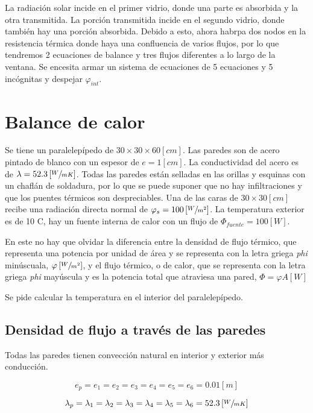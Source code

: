 \documentclass[12pt]{article}
\begin{document}
La radiación solar incide en el primer vidrio, donde una parte es absorbida y la otra transmitida. La porción transmitida incide en el segundo vidrio, donde también hay una porción absorbida. Debido a esto, ahora habrpa dos nodos en la resistencia térmica donde haya una confluencia de varios flujos, por lo que tendremos 2 ecuaciones de balance y tres flujos diferentes a lo largo de la ventana. Se encesita armar un sistema de ecuaciones de 5 ecuaciones y 5 incógnitas y despejar $ \varphi _{ int } $.


\section{Balance de calor}

Se tiene un paralelepípedo de $ 30 \times 30 \times 60 \left[ cm \right] $. Las paredes son de acero pintado de blanco con un espesor de $ e = 1 \left[ cm \right] $. La conductividad del acero es de $ \lambda = 52.3 \left[ \sfrac{ W }{ m K } \right] $. Todas las paredes están selladas en las orillas y esquinas con un chaflán de soldadura, por lo que se puede suponer que no hay infiltraciones y que los puentes térmicos son despreciables. Una de las caras de $ 30 \times 30 \left[ cm \right] $ recibe una radiación directa normal de $ \varphi _s = 100 \left[ \sfrac{ W }{ m ^2 } \right] $. La temperatura exterior es de 10 \degree C, hay un fuente interna de calor con un flujo de $ \Phi _{ fuente } = 100 \left[ W \right] $.

En este no hay que olvidar la diferencia entre la densidad de flujo térmico, que representa una potencia por unidad de área y se representa con la letra griega \emph{phi} minúscuala, $ \varphi \left[ \sfrac{ W }{ m ^2 } \right] $, y el flujo térmico, o de calor, que se representa con la letra griega \emph{phi} mayúscula y es la potencia total que atraviesa una pared, $ \Phi = \varphi A \left[ W \right] $

Se pide calcular la temperatura en el interior del paralelepípedo.

\subsection{Densidad de flujo a través de las paredes}

Todas las paredes tienen convección natural en interior y exterior más conducción.

\[ e_p = e_1 = e_2 = e_3 = e_4 = e_5 = e_6 = 0.01 \left[ m \right] \]

\[ \lambda _p = \lambda _1 = \lambda _2 = \lambda _3 = \lambda _4 = \lambda _5 = \lambda _6 = 52.3 \left[ \sfrac{ W }{ m K } \right] \]
\end{document}
